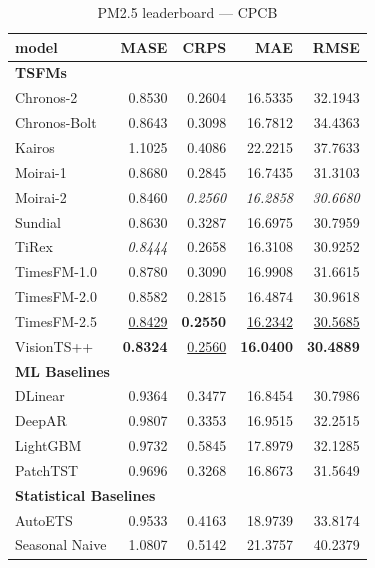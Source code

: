 \begin{table}[H]
\caption{PM2.5 leaderboard --- CPCB}
\centering
\begin{small}
\begin{tabular}{lrrrr}
\toprule
model & MASE & CRPS & MAE & RMSE \\
\midrule
\multicolumn{5}{l}{\textbf{TSFMs}} \\
Chronos-2 & 0.8530 & 0.2604 & 16.5335 & 32.1943 \\
Chronos-Bolt & 0.8643 & 0.3098 & 16.7812 & 34.4363 \\
Kairos & 1.1025 & 0.4086 & 22.2215 & 37.7633 \\
Moirai-1 & 0.8680 & 0.2845 & 16.7435 & 31.3103 \\
Moirai-2 & 0.8460 & \textit{0.2560} & \textit{16.2858} & \textit{30.6680} \\
Sundial & 0.8630 & 0.3287 & 16.6975 & 30.7959 \\
TiRex & \textit{0.8444} & 0.2658 & 16.3108 & 30.9252 \\
TimesFM-1.0 & 0.8780 & 0.3090 & 16.9908 & 31.6615 \\
TimesFM-2.0 & 0.8582 & 0.2815 & 16.4874 & 30.9618 \\
TimesFM-2.5 & \underline{0.8429} & \textbf{0.2550} & \underline{16.2342} & \underline{30.5685} \\
VisionTS++ & \textbf{0.8324} & \underline{0.2560} & \textbf{16.0400} & \textbf{30.4889} \\
\midrule
\multicolumn{5}{l}{\textbf{ML Baselines}} \\
DLinear & 0.9364 & 0.3477 & 16.8454 & 30.7986 \\
DeepAR & 0.9807 & 0.3353 & 16.9515 & 32.2515 \\
LightGBM & 0.9732 & 0.5845 & 17.8979 & 32.1285 \\
PatchTST & 0.9696 & 0.3268 & 16.8673 & 31.5649 \\
\midrule
\multicolumn{5}{l}{\textbf{Statistical Baselines}} \\
AutoETS & 0.9533 & 0.4163 & 18.9739 & 33.8174 \\
Seasonal Naive & 1.0807 & 0.5142 & 21.3757 & 40.2379 \\
\bottomrule
\end{tabular}
\end{small}
\end{table}